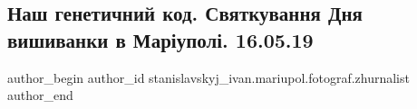  
 
 
 
 

\subsection{Наш генетичний код. Святкування Дня вишиванки в Маріуполі. 16.05.19}
\label{sec:17_05_2019.fb.stanislavskyj_ivan.mariupol.fotograf.zhurnalist.1.nash_genetychnyj_kod_svjatkuvannja_dnja_vyshyvanky}

\ifcmt
 author_begin
   author_id stanislavskyj_ivan.mariupol.fotograf.zhurnalist
 author_end
\fi

